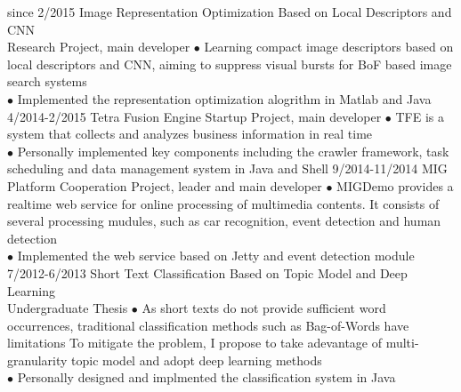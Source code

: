 \documentclass[]{friggeri-cv}
\begin{document}
\begin{entrylist}
  \entry
    {since 2/2015}
    {Image Representation Optimization Based on Local Descriptors and CNN \\ }
    {Research Project, main developer}
    {$\bullet$ Learning compact image descriptors based on local descriptors and CNN, aiming to suppress visual bursts for BoF based image search systems \\
    $\bullet$ Implemented the representation optimization alogrithm in Matlab and Java}
  \entry
    {4/2014-2/2015}
    {Tetra Fusion Engine}
    {Startup Project, main developer}
    {$\bullet$ TFE is a system that collects and analyzes business information in real time \\
    $\bullet$ Personally implemented key components including the crawler framework, task scheduling and data management system in Java and Shell}
  \entry
    {9/2014-11/2014}
    {MIG Platform}
    {Cooperation Project, leader and main developer}
    {$\bullet$ MIGDemo provides a realtime web service for online processing of multimedia contents. It consists of several processing mudules, such as car recognition, event detection and human detection\\
    $\bullet$ Implemented the web service based on Jetty and event detection module}
  \entry
    {7/2012-6/2013}
    {Short Text Classification Based on Topic Model and Deep Learning \\ }
    {Undergraduate Thesis}
    {$\bullet$ As short texts do not provide sufficient word occurrences, traditional classification methods such as Bag-of-Words have limitations
    To mitigate the problem, I propose to take adevantage of multi-granularity topic model and adopt deep learning methods \\
    $\bullet$ Personally designed and implmented the classification system in Java}
\end{entrylist}
\end{document}
